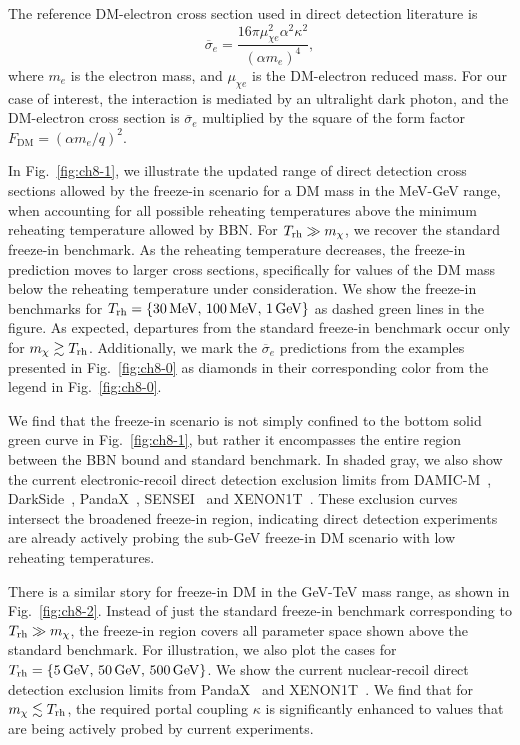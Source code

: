 The reference DM-electron cross section used in direct detection literature is~\cite{Essig:2015cda}
\begin{equation}
    \overline{\sigma}_e=\frac{16\pi \mu_{\chi e}^2\alpha^2\kappa^2}{(\alpha m_e)^4},
    \label{eq:ch8-sigmae}
\end{equation}
where $m_e$ is the electron mass, and $\mu_{\chi e}$ is the DM-electron reduced mass. For our case of interest, the interaction is mediated by an ultralight dark photon, and the DM-electron cross section is $\overline{\sigma}_e$ multiplied by the square of the form factor $F_\mathrm{DM} = (\alpha m_e / q)^2$.

In Fig.~\ref{fig:ch8-1}, we illustrate the updated range of direct detection cross sections allowed by the freeze-in scenario for a DM mass in the MeV-GeV range, when accounting for all possible reheating temperatures above the minimum reheating temperature allowed by BBN. For $T_{\rm rh}\gg m_\chi$, we recover the standard freeze-in benchmark. As the reheating temperature decreases, the freeze-in prediction moves to larger cross sections, specifically for values of the DM mass below the reheating temperature under consideration. We show the freeze-in benchmarks for $T_{\rm{rh}}=\{30\,\mathrm{MeV},\,100\,\mathrm{MeV},\, 1\,\mathrm{GeV}\}$ as dashed green lines in the figure. As expected, departures from the standard freeze-in benchmark occur only for $m_\chi\gtrsim T_{\rm{rh}}$. Additionally, we mark the $\overline{\sigma}_e$ predictions from the examples presented in Fig.~\ref{fig:ch8-0} as diamonds in their corresponding color from the legend in Fig.~\ref{fig:ch8-0}.

We find that the freeze-in scenario is not simply confined to the bottom solid green curve in Fig.~\ref{fig:ch8-1}, but rather it encompasses the entire region between the BBN bound and standard benchmark.
In shaded gray, we also show the current electronic-recoil direct detection exclusion limits from DAMIC-M~\cite{DAMIC-M:2023gxo,DAMIC-M:2023hgj}, DarkSide~\cite{DarkSide:2022knj}, PandaX~\cite{PandaX-II:2017hlx,PandaX:2022xqx}, SENSEI~\cite{SENSEI:2020dpa} and XENON1T~\cite{XENON:2018voc,Hambye:2018dpi}.
These exclusion curves intersect the broadened freeze-in region, indicating direct detection experiments are already actively probing the sub-GeV freeze-in DM scenario with low reheating temperatures.

There is a similar story for freeze-in DM in the GeV-TeV mass range, as shown in Fig.~\ref{fig:ch8-2}. Instead of just the standard freeze-in benchmark corresponding to $T_{\rm rh}\gg m_\chi$, the freeze-in region covers all parameter space shown above the standard benchmark. For illustration, we also plot the cases for $T_{\rm{rh}}=\{5\,\mathrm{GeV},\,50\,\mathrm{GeV},\, 500\,\mathrm{GeV}\}$.
We show the current nuclear-recoil direct detection exclusion limits from PandaX~\cite{PandaX-II:2017hlx} and XENON1T~\cite{XENON:2018voc,Hambye:2018dpi}. We find that for $m_\chi\lesssim T_{\rm rh}$, the required portal coupling $\kappa$ is significantly enhanced to values that are being actively probed by current experiments.


